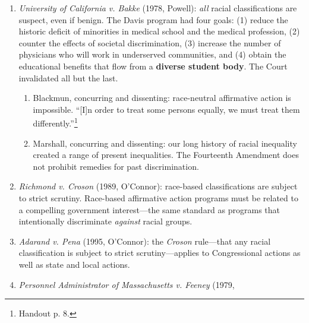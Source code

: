 \begin{enumerate}
    involved.
    \begin{enumerate}
        \item Stewart, concurring: racial awareness is not unconstitutional 
        per se. If there is no disparate impact (\emph{Davis}) and no 
        discriminatory intent, there is no constitutional violation.
        \item Brennan, concurring: benign racial classifications can have 
        invidious results---for instance, they can ``serve to stimulate our 
        society's latent race consciousness.''\footnote{Handout p. 3.}
    \end{enumerate}
    \item \emph{University of California v. Bakke} (1978, Powell): \emph{all} 
    racial classifications are suspect, even if benign. The Davis program had 
    four goals: (1) reduce the historic deficit of minorities in medical 
    school and the medical profession, (2) counter the effects of societal 
    discrimination, (3) increase the number of physicians who will work in 
    underserved communities, and (4) obtain the educational benefits that flow 
    from a \textbf{diverse student body}. The Court invalidated all but the 
    last.
    \begin{enumerate}
        \item Blackmun, concurring and dissenting: race-neutral affirmative 
        action is impossible. ``[I]n order to treat some persons equally, we 
        must treat them differently.''\footnote{Handout p. 8.}
        \item Marshall, concurring and dissenting: our long history of racial 
        inequality created a range of present inequalities. The Fourteenth 
        Amendment does not prohibit remedies for past discrimination.
    \end{enumerate}
    \item \emph{Richmond v. Croson} (1989, O'Connor): race-based 
    classifications are subject to strict scrutiny.  Race-based affirmative 
    action programs must be related to a compelling government interest---the 
    same standard as programs that intentionally discriminate \emph{against} 
    racial groups.
    \item \emph{Adarand v. Pena} (1995, O'Connor): the \emph{Croson} 
    rule---that any racial classification is subject to strict 
    scrutiny---applies to Congressional actions as well as state and local 
    actions. 
    \item \emph{Personnel Administrator of Massachusetts v. Feeney} (1979, 

\end{enumerate}

